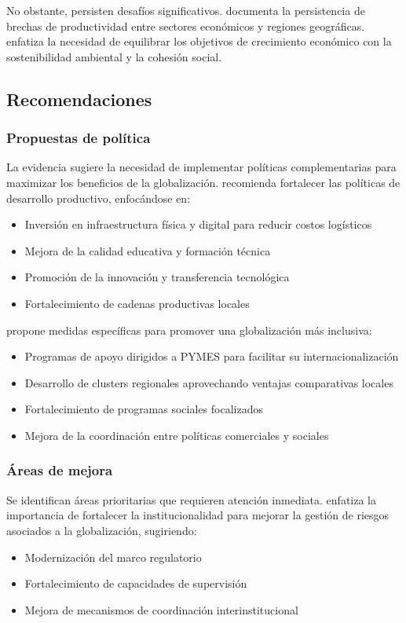 \documentclass[12pt, a4paper]{article}
\begin{document}
No obstante, persisten desafíos significativos. \textcite{jimenez2021brechas} documenta la persistencia de brechas de productividad entre sectores económicos y regiones geográficas. \textcite{gonzales2022sostenibilidad} enfatiza la necesidad de equilibrar los objetivos de crecimiento económico con la sostenibilidad ambiental y la cohesión social.

\subsection{Recomendaciones}

\subsubsection{Propuestas de política}
La evidencia sugiere la necesidad de implementar políticas complementarias para maximizar los beneficios de la globalización. \textcite{morales2022politicas} recomienda fortalecer las políticas de desarrollo productivo, enfocándose en:
\begin{itemize}
    \item Inversión en infraestructura física y digital para reducir costos logísticos
    \item Mejora de la calidad educativa y formación técnica
    \item Promoción de la innovación y transferencia tecnológica
    \item Fortalecimiento de cadenas productivas locales
\end{itemize}

\textcite{garcia2021inclusion} propone medidas específicas para promover una globalización más inclusiva:
\begin{itemize}
    \item Programas de apoyo dirigidos a PYMES para facilitar su internacionalización
    \item Desarrollo de clusters regionales aprovechando ventajas comparativas locales
    \item Fortalecimiento de programas sociales focalizados
    \item Mejora de la coordinación entre políticas comerciales y sociales
\end{itemize}

\subsubsection{Áreas de mejora}
Se identifican áreas prioritarias que requieren atención inmediata. \textcite{ramirez2022institucionalidad} enfatiza la importancia de fortalecer la institucionalidad para mejorar la gestión de riesgos asociados a la globalización, sugiriendo:
\begin{itemize}
    \item Modernización del marco regulatorio
    \item Fortalecimiento de capacidades de supervisión
    \item Mejora de mecanismos de coordinación interinstitucional
\end{itemize}
\end{document}
